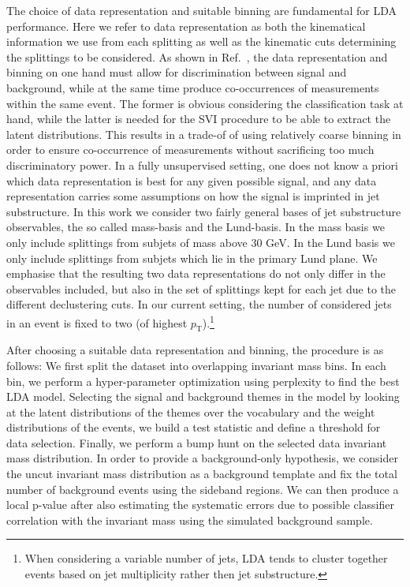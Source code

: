 \documentclass[a4paper,11pt]{article}
\begin{document}
The choice of data representation and suitable binning are fundamental for LDA performance. Here we refer to data representation as both the kinematical information we use from each splitting as well as the kinematic cuts determining the splittings to be considered. As shown in Ref.~\cite{1797846}, the data representation and binning on one hand must allow for discrimination between signal and background, while at the same time produce co-occurrences of measurements within the same event. The former is obvious  considering the classification task at hand, while the latter is needed for the SVI procedure to be able to extract the latent distributions. This results in a trade-of of using relatively coarse binning in order to ensure co-occurrence of measurements without sacrificing too much discriminatory power. In a fully unsupervised setting, one does not know a priori which data representation is best for any given possible signal, and any data representation carries some assumptions on how the signal is imprinted in jet substructure. In this work we consider two fairly general bases of jet substructure observables, the so called mass-basis and the Lund-basis.
In the mass basis we only include splittings from subjets of mass above $30$ GeV.
In the Lund basis we only include splittings from subjets which lie in the primary Lund plane.
We emphasise that the resulting two data representations do not only differ in the observables included,
but also in the set of splittings kept for each jet due to the different declustering cuts. In our current setting, the number of considered jets in an event is fixed to two (of highest $p_\text{T}$).\footnote{When considering a variable number of jets, LDA tends to cluster together events based on jet multiplicity rather then jet substructure.}

After choosing a suitable data representation and binning, the procedure is as follows:  We first split the dataset into overlapping invariant mass bins. In each bin, we perform a hyper-parameter optimization using perplexity to find the best LDA model. Selecting the signal and background themes in the model by looking at the latent distributions of the themes over the vocabulary and the weight distributions of the events, we build a test statistic and define a threshold for data selection. Finally, we perform a bump hunt on the selected data invariant mass distribution.  In order to provide a background-only hypothesis, we consider the uncut invariant mass distribution as a background template and fix the total number of background events using the sideband regions. We can then produce a local p-value after also estimating the systematic errors due to possible classifier correlation with the invariant mass using the simulated background sample.
\end{document}
